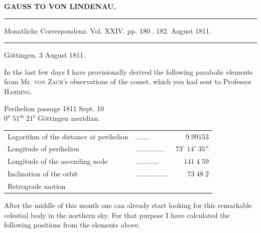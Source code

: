 \clearpage{}\hypertarget{native-331-lower}{}\label{native-331-lower}
\begin{center}\textbf{GAUSS TO VON LINDENAU.}\par\vspace{4pt}\hrule\vspace{4pt}\fontsize{10}{12}\selectfont Monatliche Correspondenz. Vol. XXIV. pp. 180\,..\,182. August 1811.\par\vspace{4pt}\hrule\vspace{4pt}\end{center}

\begin{flushright}Göttingen, 3 August 1811.\end{flushright}
\par\indent In the last few days I have provisionally derived the following parabolic elements from Mr. \textsc{von Zach}’s observations of the comet, which you had sent to Professor \textsc{Harding}.
\begin{center}\fontsize{10}{12}\selectfont Perihelion passage 1811 Sept. 10\\$0^{\text{u}}\;51^{\text{m}}\;21^{\text{s}}$ Göttingen meridian.\end{center}

\begin{center}\fontsize{10}{12}\selectfont\setlength{\tabcolsep}{4pt}\renewcommand{\arraystretch}{1.15}\begin{tabular}{llr}
Logarithm of the distance at perihelion & .\;.\;.\;.\;.\;.\;. & $9.99153$\\
Longitude of perihelion & .\;.\;.\;.\;.\;.\;.\;.\;.\;.\;.\;.\;.\;.\;. & $73^\circ\;14'\;35''$\\
Longitude of the ascending node & .\;.\;.\;.\;.\;.\;.\;.\;.\;.\;.\;. & $141\;4\;59$\\
Inclination of the orbit & .\;.\;.\;.\;.\;.\;.\;.\;.\;.\;.\;.\;.\;.\;.\;.\;. & $73\;48\;2$\\
Retrograde motion &  & \\
\end{tabular}\end{center}

\par\indent After the middle of this month one can already start looking for this remarkable celestial body in the northern sky. For that purpose I have calculated the following positions from the elements above.


